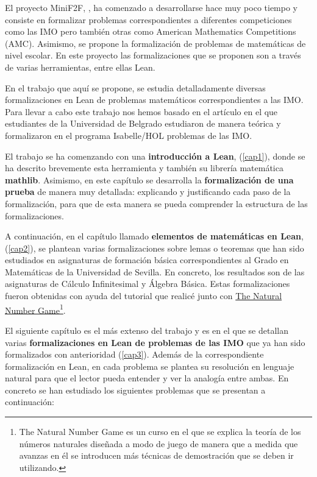 El proyecto MiniF2F, \cite{mini}, ha comenzado a desarrollarse hace muy
poco tiempo y consiste en formalizar problemas correspondientes a
diferentes competiciones como las IMO pero también otras como American
Mathematics Competitions (AMC). Asimismo, se propone la formalización de
problemas de matemáticas de nivel escolar. En este proyecto las
formalizaciones que se proponen son a través de varias herramientas,
entre ellas Lean.

En el trabajo que aquí se propone, se estudia detalladamente diversas
formalizaciones en Lean de problemas matemáticos correspondientes a las
IMO. Para llevar a cabo este trabajo nos hemos basado en el artículo
\cite{ART} en el que estudiantes de la Universidad de Belgrado
estudiaron de manera teórica y formalizaron en el programa Isabelle/HOL
problemas de las IMO.

El trabajo se ha comenzando con una \textbf{introducción a Lean},
(\ref{cap1}), donde se ha descrito brevemente esta herramienta y también
su librería matemática \textbf{mathlib}. Asimismo, en este capítulo se
desarrolla la \textbf{formalización de una prueba} de manera muy
detallada: explicando y justificando cada paso de la formalización, para
que de esta manera se pueda comprender la estructura de las
formalizaciones.

A continuación, en el capítulo llamado \textbf{elementos de matemáticas
  en Lean}, (\ref{cap2}), se plantean varias formalizaciones sobre lemas
o teoremas que han sido estudiados en asignaturas de formación básica
correspondientes al Grado en Matemáticas de la Universidad de Sevilla.
En concreto, los resultados son de las asignaturas de Cálculo
Infinitesimal y Álgebra Básica. Estas formalizaciones fueron obtenidas
con ayuda del tutorial \cite{tutor} que realicé junto con
\href{https://www.ma.imperial.ac.uk/~buzzard/xena/natural_number_game/}{The
  Natural Number Game}\footnote{The Natural Number Game es un curso en
  el que se explica la teoría de los números naturales diseñada a modo
  de juego de manera que a medida que avanzas en él se introducen más
  técnicas de demostración que se deben ir utilizando.}.

El siguiente capítulo es el más extenso del trabajo y es en el que se
detallan varias \textbf{formalizaciones en Lean de problemas de las IMO}
que ya han sido formalizados con anterioridad (\ref{cap3}). Además de la
correspondiente formalización en Lean, en cada problema se plantea su
resolución en lenguaje natural para que el lector pueda entender y ver
la analogía entre ambas. En concreto se han estudiado los siguientes
problemas que se presentan a continuación:

